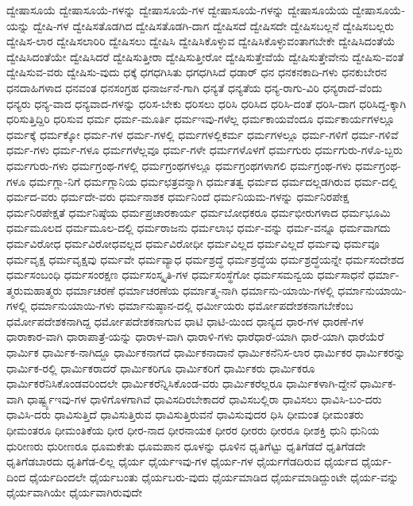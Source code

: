 {ದ್ವೇಷಾಸೂಯೆ
ದ್ವೇಷಾಸೂಯೆ-ಗಳನ್ನು
ದ್ವೇಷಾಸೂಯೆ-ಗಳ
ದ್ವೇಷಾಸೂಯೆ-ಗಳನ್ನು
ದ್ವೇಷಾಸೂಯೆಯ
ದ್ವೇಷಾಸೂಯೆ-ಯನ್ನು
ದ್ವೇಷಿ-ಗಳ
ದ್ವೇಷಿಸತೊಡಗಿದ
ದ್ವೇಷಿಸತೊಡಗಿ-ದಾಗ
ದ್ವೇಷಿಸದೆ
ದ್ವೇಷಿಸದೇ
ದ್ವೇಷಿಸಬಲ್ಲನೆ
ದ್ವೇಷಿಸಬಲ್ಲರು
ದ್ವೇಷಿಸ-ಲಾರ
ದ್ವೇಷಿಸಲಾರಿರಿ
ದ್ವೇಷಿಸಲು
ದ್ವೇಷಿಸಿ
ದ್ವೇಷಿಸಿಕೊಳ್ಳುವ
ದ್ವೇಷಿಸಿಕೊಳ್ಳುವಂತಾಗಬೇಕೇ
ದ್ವೇಷಿಸಿದಂತೆಯೆ
ದ್ವೇಷಿಸಿದಂತೆಯೇ
ದ್ವೇಷಿಸಿದರೆ
ದ್ವೇಷಿಸುತ್ತೀರಾ
ದ್ವೇಷಿಸುತ್ತೀರೋ
ದ್ವೇಷಿಸುತ್ತೇವೆಯೆ
ದ್ವೇಷಿಸುತ್ತೇವೇನು
ದ್ವೇಷಿಸು-ವಂತೆ
ದ್ವೇಷಿಸುವ-ವರು
ದ್ವೇಷಿಸು-ವುದು
ಧಕ್ಕೆ
ಧಗಧಗಿಸಿತು
ಧಗಧಗಿಸಿದೆ
ಧಡಾರ್
ಧನ
ಧನಕನಕಾದಿ-ಗಳು
ಧನಕುಬೇರನ
ಧನದಾಹಿಗಳಾದ
ಧನವಂತ
ಧನಸಂಗ್ರಹ
ಧನಾರ್ಜನೆ-ಗಾಗಿ
ಧನ್ಯತೆ
ಧನ್ಯತೆಯ
ಧನ್ಯ-ರಾಗು-ವಿರಿ
ಧನ್ಯರಾದೆ-ವೆಂದು
ಧನ್ಯರು
ಧನ್ಯ-ವಾದ
ಧನ್ಯವಾದ-ಗಳನ್ನು
ಧರಿಸ-ಬೇಕು
ಧರಿಸಲು
ಧರಿಸಿ
ಧರಿಸಿದ
ಧರಿಸಿ-ದಂತೆ
ಧರಿಸಿ-ದಾಗ
ಧರಿಸಿದ್ದ-ಕ್ಕಾಗಿ
ಧರಿಸುತ್ತಿದ್ದಿರಿ
ಧರಿಸುವ
ಧರ್ಮ
ಧರ್ಮ-ಮೂರ್ತಿ
ಧರ್ಮಇವು-ಗಳೆಲ್ಲ
ಧರ್ಮಕಾಯವೆಂದೂ
ಧರ್ಮಕಾರ್ಯಗಳಲ್ಲೂ
ಧರ್ಮಕ್ಕೆ
ಧರ್ಮಕ್ಕೋ
ಧರ್ಮ-ಗಳ
ಧರ್ಮ-ಗಳಲ್ಲಿ
ಧರ್ಮಗಳಲ್ಲಿಕರ್ಮ
ಧರ್ಮಗಳಲ್ಲೂ
ಧರ್ಮ-ಗಳಿಗೆ
ಧರ್ಮ-ಗಳಿವೆ
ಧರ್ಮ-ಗಳು
ಧರ್ಮ-ಗಳೂ
ಧರ್ಮಗಳೆಲ್ಲವೂ
ಧರ್ಮ-ಗಳೇ
ಧರ್ಮಗಳೊಳಗೆ
ಧರ್ಮಗುರು
ಧರ್ಮಗುರು-ಗಳೊ-ಬ್ಬರು
ಧರ್ಮಗುರು-ಗಳು
ಧರ್ಮಗ್ರಂಥ-ಗಳಲ್ಲಿ
ಧರ್ಮಗ್ರಂಥಗಳಲ್ಲೂ
ಧರ್ಮಗ್ರಂಥಗಳಾಗಲಿ
ಧರ್ಮಗ್ರಂಥ-ಗಳು
ಧರ್ಮಗ್ರಂಥ-ಗಳೂ
ಧರ್ಮಗ್ಲಾ-ನಿಗೆ
ಧರ್ಮಗ್ಲಾನಿಯ
ಧರ್ಮಛತ್ರವನ್ನಾಗಿ
ಧರ್ಮತತ್ವ
ಧರ್ಮದ
ಧರ್ಮದಲ್ಲಡಗಿರುವ
ಧರ್ಮ-ದಲ್ಲಿ
ಧರ್ಮದ-ವರು
ಧರ್ಮದೇ-ವರು
ಧರ್ಮನಾಶಕ
ಧರ್ಮನಿಂದೆ
ಧರ್ಮನಿಯಮ-ಗಳನ್ನು
ಧರ್ಮನಿರಪೇಕ್ಷ
ಧರ್ಮನಿರಪೇಕ್ಷತೆ
ಧರ್ಮನಿಷ್ಠೆಯ
ಧರ್ಮಪ್ರಚಾರಕಾರ್ಯ
ಧರ್ಮಬೋಧಕರೂ
ಧರ್ಮಭೀರುಗಳಾದ
ಧರ್ಮಭೂಮಿ
ಧರ್ಮಮೂಲದ
ಧರ್ಮಮೂಲ-ದಲ್ಲಿ
ಧರ್ಮರಾಜನು
ಧರ್ಮಲಾಭ
ಧರ್ಮ-ವನ್ನು
ಧರ್ಮ-ವನ್ನೂ
ಧರ್ಮವಾಗದು
ಧರ್ಮವಿರೋಧ
ಧರ್ಮವಿರೋಧವಲ್ಲದ
ಧರ್ಮವಿರೋಧೀ
ಧರ್ಮವಿಲ್ಲದ
ಧರ್ಮವಿಲ್ಲದೆ
ಧರ್ಮವು
ಧರ್ಮವೂ
ಧರ್ಮವೃಕ್ಷ
ಧರ್ಮವೃಕ್ಷವು
ಧರ್ಮವೇ
ಧರ್ಮವ್ಯಾಧ
ಧರ್ಮಶ್ರದ್ಧೆ
ಧರ್ಮಶ್ರದ್ಧೆಯ
ಧರ್ಮಶ್ರದ್ಧೆಯನ್ನೇ
ಧರ್ಮಸಂದೇಶದ
ಧರ್ಮಸಂಬಂಧಿ
ಧರ್ಮಸಂರಕ್ಷಣ
ಧರ್ಮಸಂಸ್ಕೃತಿ-ಗಳ
ಧರ್ಮಸಂಸ್ಥೆಗೋ
ಧರ್ಮಸಮನ್ವಯ
ಧರ್ಮಸಾಧನೆ
ಧರ್ಮಾ-ತ್ಮರುಮಹಾತ್ಮರು
ಧರ್ಮಾಚರಣೆ
ಧರ್ಮಾಚರಣೆಯ
ಧರ್ಮಾತ್ಮ-ನಾಗಿ
ಧರ್ಮಾನು-ಯಾಯಿ-ಗಳಲ್ಲಿ
ಧರ್ಮಾನುಯಾಯಿ-ಗಳಲ್ಲಿ
ಧರ್ಮಾನುಯಾಯಿ-ಗಳು
ಧರ್ಮಾನುಷ್ಠಾನ-ದಲ್ಲಿ
ಧರ್ಮೀಯರು
ಧರ್ಮೋಪದೇಶಕನಾಗಬೇಕೆಂಬ
ಧರ್ಮೋಪದೇಶಕನಾಗಿದ್ದ
ಧರ್ಮೋಪದೇಶಕನಾಗುವ
ಧಾಟಿ
ಧಾಟಿ-ಯಿಂದ
ಧಾನ್ಯದ
ಧಾರ-ಗಳ
ಧಾರಣೆ-ಗಳ
ಧಾರಾಕಾರ-ವಾಗಿ
ಧಾರಾಪಾತ್ರೆ-ಯನ್ನು
ಧಾರಾಳ-ವಾಗಿ
ಧಾರಾಳಿ-ಗಳು
ಧಾರೆಧಾರೆ-ಯಾಗಿ
ಧಾರೆ-ಯಾಗಿ
ಧಾರೆಯೆರೆ
ಧಾರ್ಮಿಕ
ಧಾರ್ಮಿಕ-ನಾಗಿದ್ದೂ
ಧಾರ್ಮಿಕನಾಗದೆ
ಧಾರ್ಮಿಕನಾದಾನೆ
ಧಾರ್ಮಿಕನೆನಿಸ-ಲಾರ
ಧಾರ್ಮಿಕರ
ಧಾರ್ಮಿಕರನ್ನು
ಧಾರ್ಮಿಕ-ರಲ್ಲಿ
ಧಾರ್ಮಿಕರಾದರೆ
ಧಾರ್ಮಿಕರಿಗೂ
ಧಾರ್ಮಿಕರಿಗೆ
ಧಾರ್ಮಿಕರು
ಧಾರ್ಮಿಕರೂ
ಧಾರ್ಮಿಕರೆನಿಸಿಕೊಂಡವರಿಂದಲೇ
ಧಾರ್ಮಿಕರೆನ್ನಿಸಿಕೊಂಡ-ವರು
ಧಾರ್ಮಿಕರೆಲ್ಲರೂ
ಧಾರ್ಮಿಕಳಾಗಿ-ದ್ದೇನೆ
ಧಾರ್ಮಿಕ-ವಾಗಿ
ಧಾರ್ಷ್ಟ್ಯಇವು-ಗಳ
ಧಾಳಿಗೊಳಗಾಗಿವೆ
ಧಾವಿಸದಿರಬೇಕಾದರೆ
ಧಾವಿಸಬಲ್ಲಿರಾ
ಧಾವಿಸಲು
ಧಾವಿಸಿ-ಬಂ-ದರು
ಧಾವಿಸಿ-ದರು
ಧಾವಿಸುತ್ತಿದೆ
ಧಾವಿಸುತ್ತಿರುವ
ಧಾವಿಸುತ್ತಿರುವನೆ
ಧಾವಿಸುವುದರ
ಧಿಸಿ
ಧೀಮಂತ
ಧೀಮಂತರು
ಧೀಮಂತರೂ
ಧೀಮಂತಿಕೆಯ
ಧೀರ
ಧೀರ-ನಾದ
ಧೀರನಾಯಕ
ಧೀರರ
ಧೀರರು
ಧೀರರೂ
ಧೀಶಕ್ತಿ
ಧುನಿ
ಧುನಿಯ
ಧುರೀಣರು
ಧುರೀಣರೂ
ಧೂಮಕೇತು
ಧೂಮಪಾನ
ಧೂಳನ್ನು
ಧೂಳಿನ
ಧೃತಿಗೆಟ್ಟು
ಧೃತಿಗೆಡದೆ
ಧೃತಿಗೆಡದೇ
ಧೃತಿಗೆಡಬಾರದು
ಧೃತಿಗೆಡ-ಲಿಲ್ಲ
ಧೈರ್ಯ
ಧೈರ್ಯಇವು-ಗಳ
ಧೈರ್ಯ-ಗಳ
ಧೈರ್ಯಗೆಡದಿರುವ
ಧೈರ್ಯದ
ಧೈರ್ಯ-ದಿಂದ
ಧೈರ್ಯದಿಂದಲೇ
ಧೈರ್ಯಬಂತು
ಧೈರ್ಯಬರು-ವುದು
ಧೈರ್ಯಮಾಡಿದ
ಧೈರ್ಯಮಾಡಿದ್ದುಂಟೇ
ಧೈರ್ಯ-ವನ್ನು
ಧೈರ್ಯವಾಗಿಯೇ
ಧೈರ್ಯವಾಗಿರುವುದೇ
}
